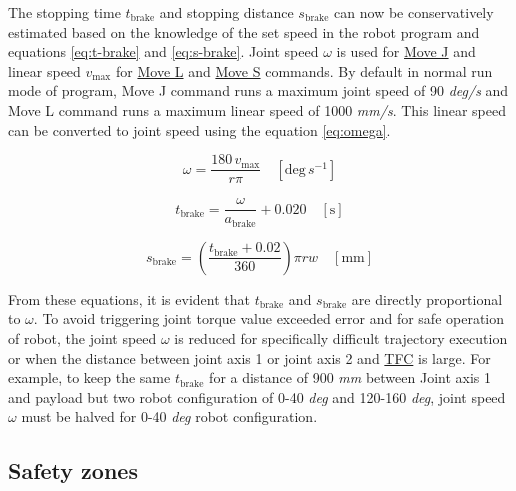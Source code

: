     The stopping time \hyperref[sym:t-brake]{$t_{\text{brake}}$} and stopping distance \hyperref[sym:s-brake]{$s_{\text{brake}}$} can now be conservatively estimated based on the knowledge of the set speed
    in the robot program and equations \ref{eq:t-brake} and \ref{eq:s-brake}. Joint speed \hyperref[sym:omega]{$\omega$} is used for \hyperref[acro:Move J]{Move J} and linear speed \hyperref[sym:v-max]{$v_{\text{max}}$} for \hyperref[acro:Move L]{Move L} and \hyperref[acro:Move S]{Move S} commands.
    By default in normal run mode of program, Move J command runs a maximum joint speed of 90 \textit{deg/s} and
    Move L command runs a maximum linear speed of 1000 \textit{mm/s}. This linear speed can be converted to joint speed
    using the equation \ref{eq:omega}.

    \begin{equation}
        \omega = \frac{180 \, v_{\text{max}}}{r\pi} \quad [\text{deg} \, s^{-1}]
        \label{eq:omega}
    \end{equation}
                
    \begin{equation}
        t_{\text{brake}} = \frac{\omega}{a_{\text{brake}}} + 0.020 \quad [\text{s}]
        \label{eq:t-brake}
    \end{equation}
        
    \begin{equation}
        s_{\text{brake}} = \left(\frac{t_{\text{brake}} + 0.02}{360}\right) \pi r w \quad [\text{mm}]
        \label{eq:s-brake}
    \end{equation}

    From these equations, it is evident that \hyperref[sym:t-brake]{$t_{\text{brake}}$} and \hyperref[sym:s-brake]{$s_{\text{brake}}$} are directly proportional to \hyperref[sym:omega]{$\omega$}.
    To avoid triggering joint torque value exceeded error and for safe operation of robot, the joint speed \hyperref[sym:omega]{$\omega$} is reduced for specifically difficult trajectory execution or when the distance
    between joint axis 1 or joint axis 2 and \hyperref[acro:TFC]{TFC} is large. For example, to keep the same \hyperref[sym:t-brake]{$t_{\text{brake}}$} for a distance of 900 \textit{mm} between Joint axis 1 and payload
    but two robot configuration of 0-40 \textit{deg} and 120-160 \textit{deg}, joint speed \hyperref[sym:omega]{$\omega$} must be halved
    for 0-40 \textit{deg} robot configuration.

\subsection{Safety zones}
\label{subsec:safety-zones}

